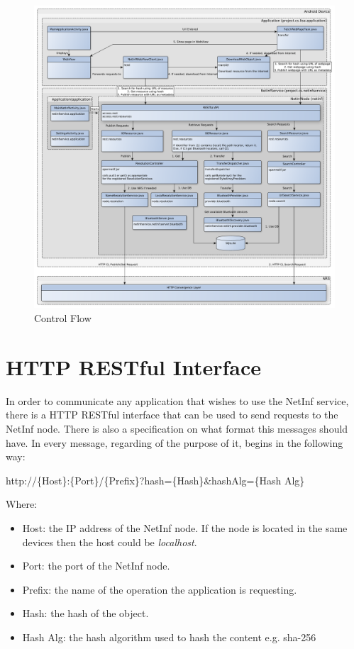 \documentclass[10pt,a4paper]{article}
\begin{document}
\begin{figure}[h!]
	\centering
		\includegraphics[width=1\textwidth]{flowchart}
    	\caption{Control Flow}
	\label{fig:controlflow}
\end{figure}

\section{HTTP RESTful Interface}
In order to communicate any application that wishes to use the NetInf service, there is a HTTP RESTful interface that can be used to 
send requests to the NetInf node. There is also a specification on what format this messages should have. In every message, regarding 
of the purpose of it, begins in the following way:\\


\begin{center}
http://\{Host\}:\{Port\}/\{Prefix\}?hash=\{Hash\}\&hashAlg=\{Hash Alg\}\\
\end{center}

Where:

\begin{itemize}
 \item Host: the IP address of the NetInf node. If the node is located in the same devices then the host could be \textit{localhost}.
 \item Port: the port of the NetInf node.
 \item Prefix: the name of the operation the application is requesting. 
 \item Hash: the hash of the object.
 \item Hash Alg: the hash algorithm used to hash the content e.g. sha-256
\end{itemize}
\end{document}
